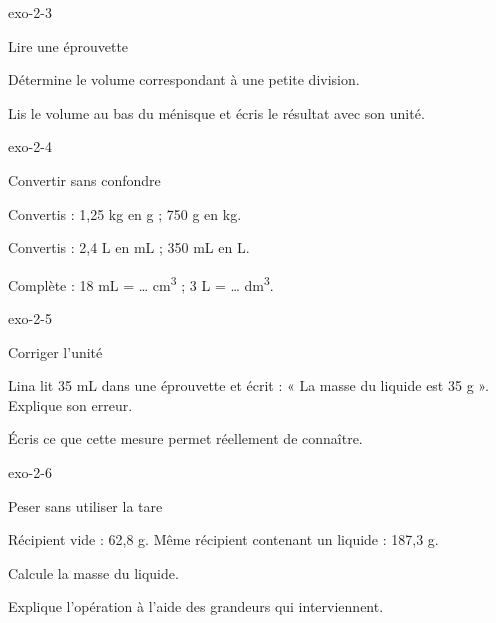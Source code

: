 \documentclass[12pt,twoside,openany]{book}
\begin{document}
\begin{blocLivre}{exo-2-3}
\begin{exercice}[1]{Lire une éprouvette}
\begin{questions}
\item Détermine le volume correspondant à une petite division.
\item Lis le volume au bas du ménisque et écris le résultat avec son unité.
\end{questions}
\end{exercice}\end{blocLivre}
\begin{blocLivre}{exo-2-4}
\begin{exercice}[1]{Convertir sans confondre}
\begin{questions}
\item Convertis : 1,25 kg en g ; 750 g en kg.
\item Convertis : 2,4 L en mL ; 350 mL en L.
\item Complète : 18 mL = … cm\textsuperscript{3} ; 3 L = … dm\textsuperscript{3}.
\end{questions}
\end{exercice}\end{blocLivre}
\begin{blocLivre}{exo-2-5}
\begin{exercice}[1]{Corriger l’unité}
\begin{questions}
\item Lina lit 35 mL dans une éprouvette et écrit : « La masse du liquide est 35 g ». Explique son erreur.
\item Écris ce que cette mesure permet réellement de connaître.
\end{questions}
\end{exercice}\end{blocLivre}
\begin{blocLivre}{exo-2-6}
\begin{exercice}[2]{Peser sans utiliser la tare}
\begin{donnees}Récipient vide : 62,8 g. Même récipient contenant un liquide : 187,3 g.\par
\end{donnees}
\begin{questions}
\item Calcule la masse du liquide.
\item Explique l’opération à l’aide des grandeurs qui interviennent.
\end{questions}
\end{exercice}\end{blocLivre}
\end{document}
